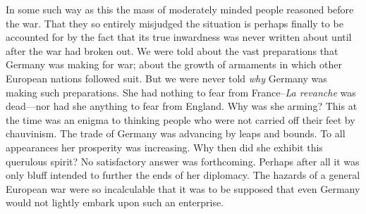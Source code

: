 \documentclass{book}
\begin{document}
In some such way as this the mass of moderately minded people reasoned before the war. That they so entirely misjudged the situation is perhaps finally to be accounted for by the fact that its true inwardness was never written about until after the war had broken out. We were told about the vast preparations that Germany was making for war; about the growth of armaments in which other European nations followed suit. But we were never told \emph{why} Germany was making such preparations. She had nothing to fear from France–\emph{La revanche} was dead—nor had she anything to fear from England. Why was she arming? This at the time was an enigma to thinking people who were not carried off their feet by chauvinism. The trade of Germany was advancing by leaps and bounds. To all appearances her prosperity was increasing. Why then did she exhibit this querulous spirit? No satisfactory answer was forthcoming. Perhaps after all it was only bluff intended to further the ends of her diplomacy. The hazards of a general European war were so incalculable that it was to be supposed that even Germany would not lightly embark upon such an enterprise.
\end{document}
